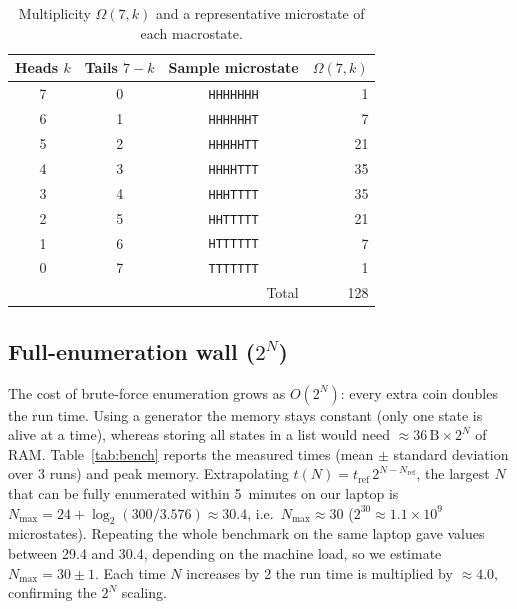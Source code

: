 \documentclass[11pt,a4paper]{article}
\begin{document}
\begin{table}[h]
\centering
\caption{Multiplicity $\Omega(7,k)$ and a representative microstate of each macrostate.}
\label{tab:n7}
\begin{tabular}{cccr}
\toprule
Heads $k$ & Tails $7-k$ & Sample microstate & $\Omega(7,k)$\\
\midrule
7 & 0 & \texttt{HHHHHHH} & 1\\
6 & 1 & \texttt{HHHHHHT} & 7\\
5 & 2 & \texttt{HHHHHTT} & 21\\
4 & 3 & \texttt{HHHHTTT} & 35\\
3 & 4 & \texttt{HHHTTTT} & 35\\
2 & 5 & \texttt{HHTTTTT} & 21\\
1 & 6 & \texttt{HTTTTTT} & 7\\
0 & 7 & \texttt{TTTTTTT} & 1\\
\midrule
\multicolumn{3}{r}{Total} & 128\\
\bottomrule
\end{tabular}
\end{table}

\subsection{Full-enumeration wall ($2^N$)}
The cost of brute-force enumeration grows as $O(2^N)$: every extra coin
doubles the run time. Using a generator the memory stays constant
(only one state is alive at a time), whereas storing all states in a list
would need $\approx 36\,\mathrm{B}\times2^N$ of RAM. Table~\ref{tab:bench}
reports the measured times (mean $\pm$ standard deviation over 3 runs) and
peak memory. Extrapolating $t(N)=t_{\mathrm{ref}}\,2^{N-N_{\mathrm{ref}}}$, the
largest $N$ that can be fully enumerated within 5~minutes on our laptop is
$N_{\max}=24+\log_2(300/3.576)\approx30.4$, i.e.\ $N_{\max}\approx30$
($2^{30}\approx1.1\times10^{9}$ microstates). Repeating the whole benchmark
on the same laptop gave values between 29.4 and 30.4, depending on the
machine load, so we estimate $N_{\max}=30\pm1$. Each time $N$ increases by 2
the run time is multiplied by $\approx4.0$, confirming the $2^N$ scaling.
\end{document}
